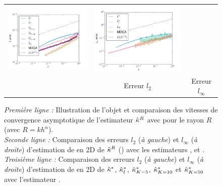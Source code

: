 \begin{figure}[ht]
\begin{center}
\begin{tabular}{@{}l c c @{}}
      \includegraphics[width=7cm]{graphs/Ellipse_PF_L2} &
      \includegraphics[width=7cm]{graphs/Ellipse_PF_Loo}
      \\
      &
      Erreur $l_2$ &
      Erreur $l_\infty$
    \end{tabular}
    \caption[Évaluation expérimentale sur l'objet \Ellipse.]{
      \emph{Première ligne :} Illustration de l'objet \Ellipse et comparaison
      des vitesses de convergence asymptotique de l'estimateur $\hat{\kappa}^{R}$ avec
       pour le rayon $R$ (avec $R=kh^\alpha$).
      \\
      \emph{Seconde ligne :} Comparaison des erreurs $l_2$ (\emph{à gauche}) et
      $l_\infty$ (\emph{à droite}) d'estimation de  en 2D de $\hat{\kappa}^{R}$
      (\II) avec les estimateurs \BC \cite{Esbelin2011}, \MDSS
      \cite{Coeurjolly2001,deVieilleville2007} et \MDCA \cite{Roussillon2011}.
      \\
      \emph{Troisième ligne :} Comparaison des erreurs $l_2$ (\emph{à gauche})
      et $l_\infty$ (\emph{à droite}) d'estimation de  en 2D de $\hat{\kappa}^{*}$,
      $\hat{\kappa}^{*}_{l}$, $\hat{\kappa}^{*}_{K=5}$, $\hat{\kappa}^{*}_{K=10}$ et $\hat{\kappa}^{*}_{K=50}$ avec
      l'estimateur \MDCA \cite{Roussillon2011}.
      }
      \label{fig:curv-experiments-ellipse}
  \end{center}
\end{figure}

